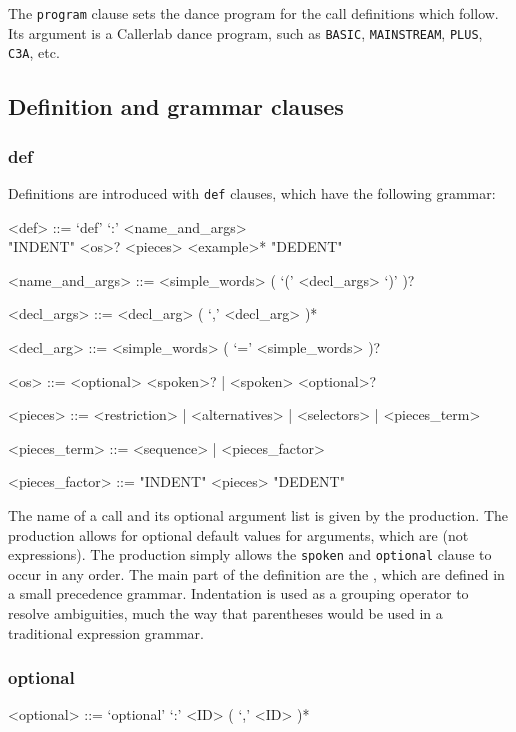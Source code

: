 \documentclass[12pt]{article}
\newcommand{\clause}[1]{\texttt{#1}}
\renewcommand{\call}[1]{\texttt{#1}} %
\begin{document}
The \clause{program} clause sets the dance program for the call
definitions which follow.  Its argument is a Callerlab dance program, such as
\call{BASIC}, \call{MAINSTREAM}, \call{PLUS}, \call{C3A}, etc.

\subsection{Definition and grammar clauses}
\subsubsection{def}
Definitions are introduced with \clause{def} clauses, which have the
following grammar:

\begin{grammar}
<def> ::= `def' `:' <name_and_args> \\ "INDENT" <os>? <pieces> <example>* "DEDENT"

<name_and_args> ::= <simple_words> ( `(' <decl_args> `)' )?

<decl_args> ::= <decl_arg> ( `,' <decl_arg> )*

<decl_arg> ::= <simple_words> ( `=' <simple_words> )?

<os> ::= <optional> <spoken>? | <spoken> <optional>?

<pieces> ::= <restriction> | <alternatives> | <selectors> | <pieces_term>

<pieces_term> ::= <sequence> | <pieces_factor>

<pieces_factor> ::= "INDENT" <pieces> "DEDENT"
\end{grammar}

The name of a call and its optional argument list is given by the
 production.  The 
production allows for optional default values for arguments, which are
 (not expressions).  The 
production simply allows the \clause{spoken} and \clause{optional}
clause to occur in any order.  The main part of the definition are the
, which are defined in a small precedence grammar.
Indentation is used as a grouping operator to resolve ambiguities,
much the way that parentheses would be used in a traditional
expression grammar.

\subsubsection{optional}
\begin{grammar}
<optional> ::= `optional' `:' <ID> ( `,' <ID> )*
\end{grammar}
\end{document}
